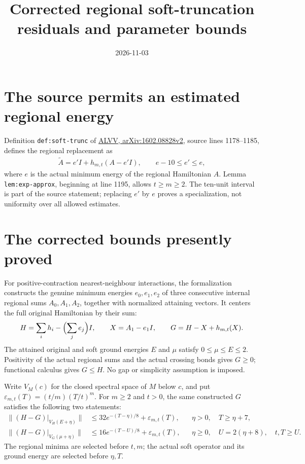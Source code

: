 \documentclass{article}
\title{Corrected regional soft-truncation residuals and parameter bounds}
\author{}
\date{2026-11-03}
\begin{document}
\maketitle
{}

\section{The source permits an estimated regional energy}

Definition \texttt{def:soft-trunc} of
\href{https://arxiv.org/abs/1602.08828v2}{ALVV, arXiv:1602.08828v2},
source lines 1178--1185, defines the regional replacement as
\begin{align}
 \widetilde A=e'I+h_{m,t}(A-e'I),\qquad e-10\leq e'\leq e,
\end{align}
where $e$ is the actual minimum energy of the regional Hamiltonian $A$.
Lemma \texttt{lem:exp-approx}, beginning at line 1195, allows $t\geq m\geq2$.
The ten-unit interval is part of the source statement; replacing $e'$ by
$e$ proves a specialization, not uniformity over all allowed estimates.

\section{The corrected bounds presently proved}

For positive-contraction nearest-neighbour interactions, the formalization
constructs the genuine minimum energies $e_0,e_1,e_2$ of three consecutive
internal regional sums $A_0,A_1,A_2$, together with normalized attaining
vectors. It centers the full original Hamiltonian by their sum:
\begin{align}
 H=\sum_i h_i-\Bigl(\sum_j e_j\Bigr)I,
 \qquad X=A_1-e_1I,
 \qquad G=H-X+h_{m,t}(X).
\end{align}
The attained original and soft ground energies $E$ and $\mu$ satisfy
$0\leq\mu\leq E\leq2$. Positivity of the actual regional sums and the
actual crossing bonds gives $G\geq0$; functional calculus gives $G\leq H$.
No gap or simplicity assumption is imposed.

Write $V_M(c)$ for the closed spectral space of $M$ below $c$, and put
$\varepsilon_{m,t}(T)=(t/m)(T/t)^m$. For $m\geq2$ and $t>0$, the same
constructed $G$ satisfies the following two statements:
\begin{align}
 \|(H-G)|_{V_H(E+\eta)}\|
 &\leq32e^{-(T-\eta)/8}+\varepsilon_{m,t}(T),
 &&\eta>0,\quad T\geq\eta+7,\\
 \|(H-G)|_{V_G(\mu+\eta)}\|
 &\leq16e^{-(T-U)/8}+\varepsilon_{m,t}(T),
 &&\eta\geq0,\quad U=2(\eta+8),\quad t,T\geq U.
\end{align}
The regional minima are selected before $t,m$; the actual soft operator and
its ground energy are selected before $\eta,T$.
\end{document}
